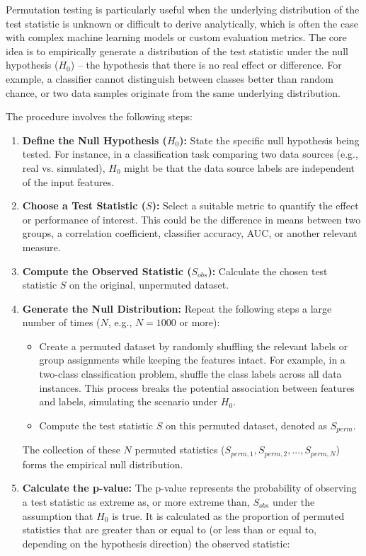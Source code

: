 Permutation testing is particularly useful when the underlying distribution of the test statistic is unknown or difficult to derive analytically, which is often the case with complex machine learning models or custom evaluation metrics. The core idea is to empirically generate a distribution of the test statistic under the null hypothesis ($H_0$) – the hypothesis that there is no real effect or difference. For example, a classifier cannot distinguish between classes better than random chance, or two data samples originate from the same underlying distribution.

The procedure involves the following steps:

\begin{enumerate}
  \item \textbf{Define the Null Hypothesis ($H_0$):} State the specific null hypothesis being tested. For instance, in a classification task comparing two data sources (e.g., real vs. simulated), $H_0$ might be that the data source labels are independent of the input features.
  \item \textbf{Choose a Test Statistic ($S$):} Select a suitable metric to quantify the effect or performance of interest. This could be the difference in means between two groups, a correlation coefficient, classifier accuracy, AUC, or another relevant measure.
  \item \textbf{Compute the Observed Statistic ($S_{obs}$):} Calculate the chosen test statistic $S$ on the original, unpermuted dataset.
  \item \textbf{Generate the Null Distribution:} Repeat the following steps a large number of times ($N$, e.g., $N=1000$ or more):
        \begin{itemize}
          \item Create a permuted dataset by randomly shuffling the relevant labels or group assignments while keeping the features intact. For example, in a two-class classification problem, shuffle the class labels across all data instances. This process breaks the potential association between features and labels, simulating the scenario under $H_0$.
          \item Compute the test statistic $S$ on this permuted dataset, denoted as $S_{perm}$.
        \end{itemize}
        The collection of these $N$ permuted statistics ($S_{perm, 1}, S_{perm, 2}, ..., S_{perm, N}$) forms the empirical null distribution.
  \item \textbf{Calculate the p-value:} The p-value represents the probability of observing a test statistic as extreme as, or more extreme than, $S_{obs}$ under the assumption that $H_0$ is true. It is calculated as the proportion of permuted statistics that are greater than or equal to (or less than or equal to, depending on the hypothesis direction) the observed statistic:

\end{enumerate}
